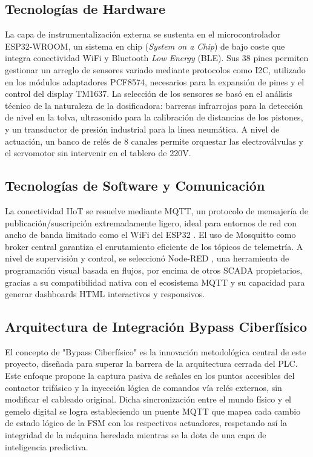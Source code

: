 \subsection*{Tecnologías de Hardware}
La capa de instrumentalización externa se sustenta en el microcontrolador ESP32-WROOM, un sistema en chip (\textit{System on a Chip}) de bajo coste que integra conectividad WiFi y Bluetooth \textit{Low Energy} (BLE). Sus 38 pines permiten gestionar un arreglo de sensores variado mediante protocolos como I2C, utilizado en los módulos adaptadores PCF8574, necesarios para la expansión de pines y el control del display TM1637. La selección de los sensores se basó en el análisis técnico de la naturaleza de la dosificadora: barreras infrarrojas para la detección de nivel en la tolva, ultrasonido para la calibración de distancias de los pistones, y un transductor de presión industrial para la línea neumática. A nivel de actuación, un banco de relés de 8 canales permite orquestar las electroválvulas y el servomotor sin intervenir en el tablero de 220V.

\subsection*{Tecnologías de Software y Comunicación}
La conectividad IIoT se resuelve mediante MQTT, un protocolo de mensajería de publicación/suscripción extremadamente ligero, ideal para entornos de red con ancho de banda limitado como el WiFi del ESP32 \cite{hunkeler2008}. El uso de Mosquitto como broker central \cite{light2017} garantiza el enrutamiento eficiente de los tópicos de telemetría. A nivel de supervisión y control, se seleccionó Node-RED \cite{blackstock2014}, una herramienta de programación visual basada en flujos, por encima de otros SCADA propietarios, gracias a su compatibilidad nativa con el ecosistema MQTT y su capacidad para generar dashboards HTML interactivos y responsivos.

\subsection*{Arquitectura de Integración Bypass Ciberfísico}
El concepto de "Bypass Ciberfísico" es la innovación metodológica central de este proyecto, diseñada para superar la barrera de la arquitectura cerrada del PLC. Este enfoque propone la captura pasiva de señales en los puntos accesibles del contactor trifásico y la inyección lógica de comandos vía relés externos, sin modificar el cableado original. Dicha sincronización entre el mundo físico y el gemelo digital se logra estableciendo un puente MQTT que mapea cada cambio de estado lógico de la FSM con los respectivos actuadores, respetando así la integridad de la máquina heredada mientras se la dota de una capa de inteligencia predictiva.

